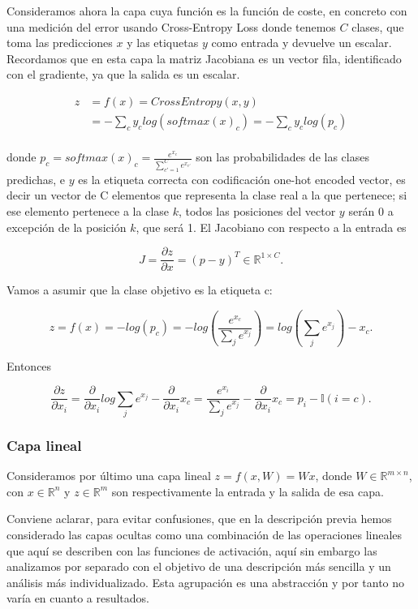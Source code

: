 Consideramos ahora la capa cuya función es la función de coste, en concreto con una medición del error usando Cross-Entropy Loss donde tenemos $C$ clases, que toma las predicciones $x$ y las etiquetas $y$ como entrada y devuelve un escalar. Recordamos que en esta capa la matriz Jacobiana es un vector fila, identificado con el gradiente, ya que la salida es un escalar.

\begin{align*}
	z&=f(x)=CrossEntropy(x,y) \\
	&= - \sum_c y_c log(softmax(x)_c) = - \sum_c y_c log(p_c)\\
\end{align*}

donde $p_c=softmax(x)_c= \frac{e^{x_c}}{\sum_{c'=1}^C e^{x_{c'}}}$ son las probabilidades de las clases predichas, e $y$ es la etiqueta correcta con codificación one-hot encoded vector, es decir un vector de C elementos que representa la clase real a la que pertenece; si ese elemento pertenece a la clase $k$, todos las posiciones del vector $y$ serán 0 a excepción de la posición $k$, que será 1. El Jacobiano con respecto a la entrada es

$$J= \frac{\partial z}{\partial x}= (p-y)^T \in \mathbb{R}^{1\times C}.$$

Vamos a asumir que la clase objetivo es la etiqueta c:

$$z=f(x)=-log(p_c)=-log \left (\frac{e^{x_c}}{\sum_j e^{x_j}} \right ) = log \left ( \sum_j e^{x_j} \right ) - x_c.$$

Entonces

$$\frac{\partial z}{\partial x_i} = \frac{\partial}{\partial x_i} log \sum_j e^{x_j} - \frac{\partial}{\partial x_i}x_c = \frac{e^{x_i}}{\sum_j e^{x_j}} - \frac{\partial}{\partial x_i}x_c = p_i - \mathbb{I}(i=c).$$

\subsubsection{Capa lineal}



Consideramos por último una capa lineal $z=f(x,W)=Wx$, donde $W \in \mathbb{R}^{m \times n}$, con $x \in \mathbb{R}^n$ y $z \in \mathbb{R}^m$ son respectivamente la entrada y la salida de esa capa.

Conviene aclarar, para evitar confusiones, que en la descripción previa hemos considerado las capas ocultas como una combinación de las operaciones lineales que aquí se describen con las funciones de activación, aquí sin embargo las analizamos por separado con el objetivo de una descripción más sencilla y un análisis más individualizado. Esta agrupación es una abstracción y por tanto no varía en cuanto a resultados.


